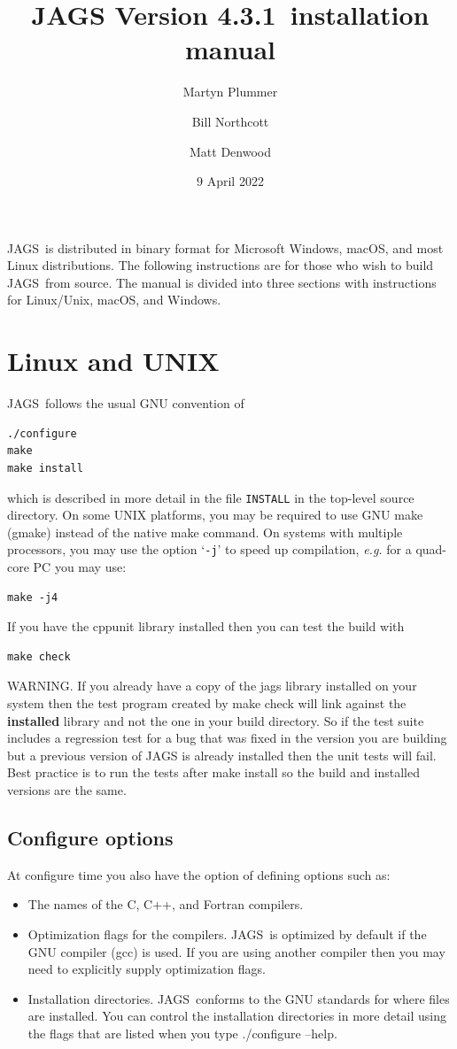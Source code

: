 \documentclass[11pt, a4paper, titlepage]{article}
\newcommand{\release}{4.3.1}
\newcommand{\JAGS}{\textsf{JAGS}}
\newcommand{\code}[1]{{\bgroup{\normalfont\ttfamily #1}\egroup}}
\newcommand{\samp}[1]{{`\bgroup\normalfont\texttt{#1}'\egroup}}
\let\command=\code
\let\option=\samp
\begin{document}
\title{JAGS Version \release\ installation manual}
\author{Martyn Plummer \and Bill Northcott \and Matt Denwood}
\date{9 April 2022}
\maketitle

\JAGS\ is distributed in binary format for Microsoft Windows, macOS, 
and most Linux distributions.  The following instructions are for
those who wish to build \JAGS\ from source. The manual is divided
into three sections with instructions for Linux/Unix, macOS, and Windows.

\section{Linux and UNIX}

\JAGS\ follows the usual GNU convention of 
\begin{verbatim}
./configure
make
make install
\end{verbatim}
which is described in more detail in the file \texttt{INSTALL} in
the top-level source directory. On some UNIX platforms, you may
be required to use GNU make (gmake) instead of the native make
command. On systems with multiple processors, you may use the option 
\option{-j} to speed up compilation, {\em e.g.} for a quad-core PC you
may use:
\begin{verbatim}
make -j4
\end{verbatim}
If you have the cppunit library installed then you can test the build with
\begin{verbatim}
make check
\end{verbatim}
WARNING. If you already have a copy of the jags library installed on
your system then the test program created by \code{make check} will
link against the {\bf installed} library and not the one in your build
directory. So if the test suite includes a regression test for a bug
that was fixed in the version you are building but a previous version
of JAGS is already installed then the unit tests will fail. Best
practice is to run the tests after \code{make install} so the build
and installed versions are the same.

\subsection{Configure options}

At configure time you also have the option of defining options such
as:
\begin{itemize}
\item The names of the C, C++, and Fortran compilers.  
\item Optimization flags for the compilers.  \JAGS\ is optimized by
  default if the GNU compiler (gcc) is used. If you are using another
  compiler then you may need to explicitly supply optimization flags.
\item Installation directories. \JAGS\ conforms to the GNU standards
  for where files are installed. You can control the installation
  directories in more detail using the flags that are listed when
  you type \command{./configure --help}.
\end{itemize}
\end{document}

